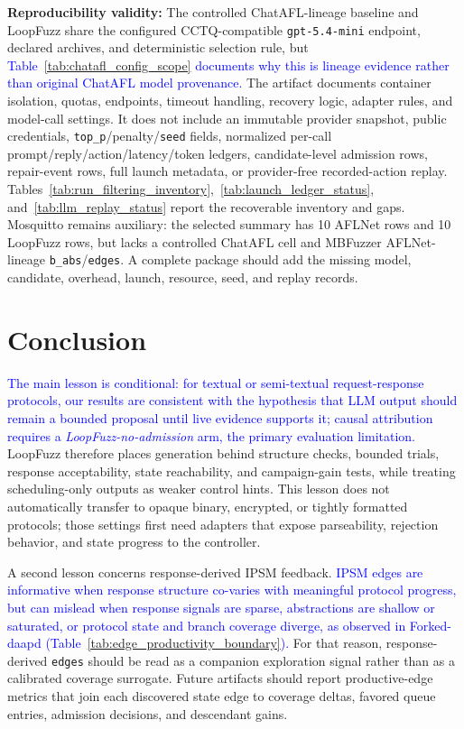 \documentclass[final,5p,times,number]{elsarticle}
\begin{document}
\textbf{Reproducibility validity:} The controlled ChatAFL-lineage baseline and LoopFuzz share the configured CCTQ-compatible \texttt{gpt-5.4-mini} endpoint, declared archives, and deterministic selection rule, but \textcolor{blue}{Table~\ref{tab:chatafl_config_scope} documents why this is lineage evidence rather than original ChatAFL model provenance.} The artifact documents container isolation, quotas, endpoints, timeout handling, recovery logic, adapter rules, and model-call settings. It does not include an immutable provider snapshot, public credentials, \texttt{top\_p}/penalty/\texttt{seed} fields, normalized per-call prompt/reply/action/latency/token ledgers, candidate-level admission rows, repair-event rows, full launch metadata, or provider-free recorded-action replay. Tables~\ref{tab:run_filtering_inventory},~\ref{tab:launch_ledger_status}, and~\ref{tab:llm_replay_status} report the recoverable inventory and gaps. Mosquitto remains auxiliary: the selected summary has 10 AFLNet rows and 10 LoopFuzz rows, but lacks a controlled ChatAFL cell and MBFuzzer AFLNet-lineage \texttt{b\_abs}/\texttt{edges}. A complete package should add the missing model, candidate, overhead, launch, resource, seed, and replay records.

\section{Conclusion}
\textcolor{blue}{The main lesson is conditional: for textual or semi-textual request-response protocols, our results are consistent with the hypothesis that LLM output should remain a bounded proposal until live evidence supports it; causal attribution requires a \emph{LoopFuzz-no-admission} arm, the primary evaluation limitation.} LoopFuzz therefore places generation behind structure checks, bounded trials, response acceptability, state reachability, and campaign-gain tests, while treating scheduling-only outputs as weaker control hints. This lesson does not automatically transfer to opaque binary, encrypted, or tightly formatted protocols; those settings first need adapters that expose parseability, rejection behavior, and state progress to the controller.

A second lesson concerns response-derived IPSM feedback. \textcolor{blue}{IPSM edges are informative when response structure co-varies with meaningful protocol progress, but can mislead when response signals are sparse, abstractions are shallow or saturated, or protocol state and branch coverage diverge, as observed in Forked-daapd (Table~\ref{tab:edge_productivity_boundary}).} For that reason, response-derived \texttt{edges} should be read as a companion exploration signal rather than as a calibrated coverage surrogate. Future artifacts should report productive-edge metrics that join each discovered state edge to coverage deltas, favored queue entries, admission decisions, and descendant gains.
\end{document}
